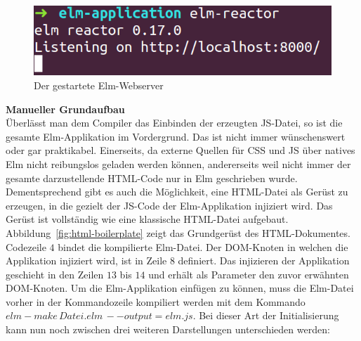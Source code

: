 \begin{figure}[htb]
\centering
\includegraphics[scale=0.4]{img/elm-reactor.png}
\caption{Der gestartete Elm-Webserver}\label{fig:elm-reactor}
\end{figure}

\noindent\textbf{Manueller Grundaufbau}\\
Überlässt man dem Compiler das Einbinden der erzeugten \ac{JS}-Datei, so ist die gesamte Elm-Applikation im Vordergrund. Das ist nicht immer wünschenswert oder gar praktikabel. Einerseits, da externe Quellen für \ac{CSS} und \ac{JS} über natives Elm nicht reibungslos geladen werden können, andererseits weil nicht immer der gesamte darzustellende \ac{HTML}-Code nur in Elm geschrieben wurde. Dementsprechend gibt es auch die Möglichkeit, eine \ac{HTML}-Datei als Gerüst zu erzeugen, in die gezielt der \ac{JS}-Code der Elm-Applikation injiziert wird. Das Gerüst ist vollständig wie eine klassische \ac{HTML}-Datei aufgebaut. Abbildung~\ref{fig:html-boilerplate} zeigt das Grundgerüst des \ac{HTML}-Dokumentes. Codezeile $4$ bindet die kompilierte Elm-Datei. Der \ac{DOM}-Knoten in welchen die Applikation injiziert wird, ist in Zeile $8$ definiert. Das injizieren der Applikation geschieht in den Zeilen $13$ bis $14$ und erhält als Parameter den zuvor erwähnten \ac{DOM}-Knoten. Um die Elm-Applikation einfügen zu können, muss die Elm-Datei vorher in der Kommandozeile kompiliert werden mit dem Kommando $elm-make\,Datei.elm\,--output=elm.js$.
Bei dieser Art der Initialisierung kann nun noch zwischen drei weiteren Darstellungen unterschieden werden:

